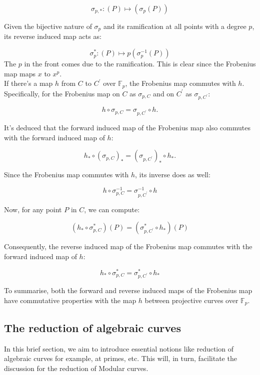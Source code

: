 \[
\sigma_{p, *}:(P) \mapsto\left(\sigma_{p}(P)\right)
\]

Given the bijective nature of \( \sigma_{p} \) and its ramification at all points with a degree \( p \), its reverse induced map acts as:

\[
\sigma_{p}^{*}:(P) \mapsto p\left(\sigma_{p}^{-1}(P)\right)
\]
The $p$ in the front comes due to the ramification. This is clear since the Frobenius map maps $x$ to $x^p$. \\

If there's a map \( h \) from \( C \) to \( C^{\prime} \) over \( \mathbb{F}_{p} \), the Frobenius map commutes with \( h \). Specifically, for the Frobenius map on \( C \) as \( \sigma_{p, C} \) and on \( C^{\prime} \) as \( \sigma_{p, C^{\prime}} \):

\[
h \circ \sigma_{p, C}=\sigma_{p, C^{\prime}} \circ h.
\]

It's deduced that the forward induced map of the Frobenius map also commutes with the forward induced map of \( h \):

\[
h_{*} \circ\left(\sigma_{p, C}\right)_{*}=\left(\sigma_{p, C^{\prime}}\right)_{*} \circ h_{*}.
\]

Since the Frobenius map commutes with \( h \), its inverse does as well:

\[
h \circ \sigma_{p, C}^{-1} = \sigma_{p, C^{\prime}}^{-1} \circ h
\]

Now, for any point \( P \) in \( C \), we can compute:

\[
\left(h_{*} \circ \sigma_{p, C}^{*}\right)(P) = \left(\sigma_{p, C^{\prime}}^{*} \circ h_{*}\right)(P)
\]

Consequently, the reverse induced map of the Frobenius map commutes with the forward induced map of \( h \):

\[
h_{*} \circ \sigma_{p, C}^{*}=\sigma_{p, C^{\prime}}^{*} \circ h_{*}
\]

To summarise, both the forward and reverse induced maps of the Frobenius map have commutative properties with the map \( h \) between projective curves over \( \mathbb{F}_{p} \).
\subsection{The reduction of algebraic curves}
In this brief section, we aim to introduce essential notions like reduction of algebraic curves for example, at primes, etc. This will, in turn, facilitate the discussion for the reduction of Modular curves. 

